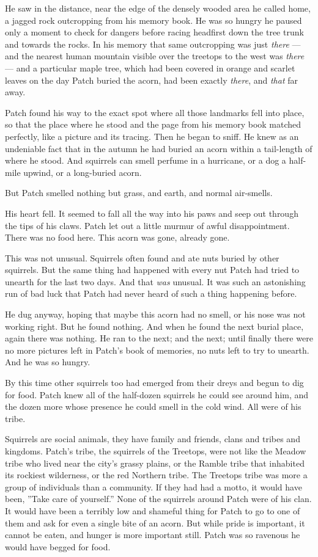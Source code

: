 \documentclass[12pt]{book}
\begin{document}
He saw in the distance, near the edge of the densely wooded area he called home, a jagged rock outcropping from his memory book. He was so hungry he paused only a moment to check for dangers before racing headfirst down the tree trunk and towards the rocks. In his memory that same outcropping was just {\it there} ---
and the nearest human mountain visible over the treetops to the west was {\it there} ---
and a particular maple tree, which had been covered in orange and scarlet leaves on the day Patch buried the acorn, had been exactly {\it there}, and {\it that} far away.

Patch found his way to the exact spot where all those landmarks fell into place, so that the place where he stood and the page from his memory book matched perfectly, like a picture and its tracing. Then he began to sniff. He knew as an undeniable fact that in the autumn he had buried an acorn within a tail-length of where he stood. And squirrels can smell perfume in a hurricane, or a dog a half-mile upwind, or a long-buried acorn.

But Patch smelled nothing but grass, and earth, and normal air-smells.

His heart fell. It seemed to fall all the way into his paws and seep out through the tips of his claws. Patch let out a little murmur of awful disappointment. There was no food here. This acorn was gone, already gone.

This was not unusual. Squirrels often found and ate nuts buried by other squirrels. But the same thing had happened with every nut Patch had tried to unearth for the last two days. And that {\it was} unusual. It was such an astonishing run of bad luck that Patch had never heard of such a thing happening before.

He dug anyway, hoping that maybe this acorn had no smell, or his nose was not working right. But he found nothing. And when he found the next burial place, again there was nothing. He ran to the next; and the next; until finally there were no more pictures left in Patch's book of memories, no nuts left to try to unearth. And he was so hungry.

By this time other squirrels too had emerged from their dreys and begun to dig for food. Patch knew all of the half-dozen squirrels he could see around him, and the dozen more whose presence he could smell in the cold wind. All were of his tribe.

Squirrels are social animals, they have family and friends, clans and tribes and kingdoms. Patch's tribe, the squirrels of the Treetops, were not like the Meadow tribe who lived near the city's grassy plains, or the Ramble tribe that inhabited its rockiest wilderness, or the red Northern tribe. The Treetops tribe was more a group of individuals than a community. If they had had a motto, it would have been, ''Take care of yourself.'' None of the squirrels around Patch were of his clan. It would have been a terribly low and shameful thing for Patch to go to one of them and ask for even a single bite of an acorn. But while pride is important, it cannot be eaten, and hunger is more important still. Patch was so ravenous he would have begged for food.
\end{document}
